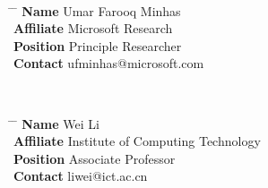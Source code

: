 \documentclass[10pt]{article} %
\begin{document}
\\
\parbox{0.5\textwidth}{ %
\begin{tabbing}
\hspace{1.5cm} \= \hspace{4cm} \= \kill %
{\bf Name} \> Umar Farooq Minhas \\ %
{\bf Affiliate} \> Microsoft Research \\ %
{\bf Position} \> Principle Researcher \\ %
{\bf Contact} \> ufminhas@microsoft.com %
\end{tabbing}}
\\
\parbox{0.5\textwidth}{ %
\begin{tabbing}
\hspace{1.5cm} \= \hspace{4cm} \= \kill %
{\bf Name} \> Wei Li\\ %
{\bf Affiliate} \> Institute of Computing Technology \\ %
{\bf Position} \> Associate Professor \\ %
{\bf Contact} \> liwei@ict.ac.cn %
\end{tabbing}}
\hfill


\end{document}
